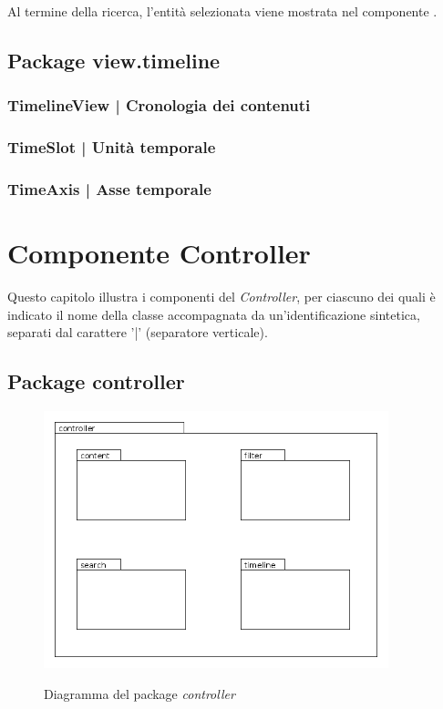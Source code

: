 \documentclass[10pt,a4paper,headinclude,footinclude,hidelinks]{scrreprt} %
\begin{document}
	Al termine della ricerca, l'entità selezionata viene mostrata nel componente \textit{}.

	\section{Package view.timeline}
	\label{sec:stage:design:sistema:view.timeline}

	\subsection[TimelineView]{TimelineView | Cronologia dei contenuti}
	\label{sec:stage:design:sistema:view.timeline:timeline-view}

	\subsection[TimeSlot]{TimeSlot | Unità temporale}
	\label{sec:stage:design:sistema:view.timeline:time-slot}

	\subsection[TimeAxis]{TimeAxis | Asse temporale}
	\label{sec:stage:design:sistema:view.timeline:time-axis}

	\chapter{Componente Controller}
	\label{ch:stage:design:controller}
	Questo capitolo illustra i componenti del \textit{Controller}, per ciascuno dei quali è indicato il nome della classe accompagnata da un'identificazione sintetica, separati dal carattere '|' (separatore verticale).

	\section{Package controller}
	\label{ch:stage:design:sistema:controller}

	\begin{figure}[ht]
		\begin{center}
	    	\includegraphics[width=10cm]{package/controller.png}
			\label{gfx:package:controller}
			\caption{Diagramma del package \textit{controller}}
		\end{center}
	\end{figure}
\end{document}
